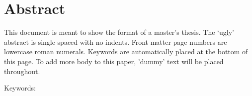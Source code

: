 \vspace{2em} %
\chapter*{Abstract}

This document is meant to show the format of a master's thesis. The `ugly' abstract is single spaced with no indents. Front matter page numbers are lowercase roman numerals. Keywords are automatically placed at the bottom of this page. To add more body to this paper, 'dummy' text will be placed throughout.

\vspace{1em}
\lipsum[1]

 \vspace{1em}
\lipsum[2]

\vfill %
\noindent Keywords: \Keywords
